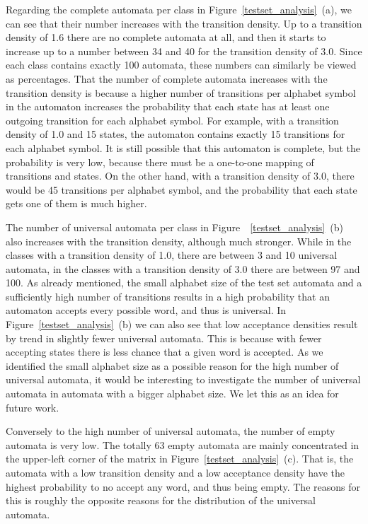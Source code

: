 Regarding the complete automata per class in Figure~\ref{testset_analysis}~(a), we can see that their number increases with the transition density. Up to a transition density of 1.6 there are no complete automata at all, and then it starts to increase up to a number between 34 and 40 for the transition density of 3.0. Since each class contains exactly 100 automata, these numbers can similarly be viewed as percentages. That the number of complete automata increases with the transition density is because a higher number of transitions per alphabet symbol in the automaton increases the probability that each state has at least one outgoing transition for each alphabet symbol. For example, with a transition density of 1.0 and 15 states, the automaton contains exactly 15 transitions for each alphabet symbol. It is still possible that this automaton is complete, but the probability is very low, because there must be a one-to-one mapping of transitions and states. On the other hand, with a transition density of 3.0, there would be 45 transitions per alphabet symbol, and the probability that each state gets one of them is much higher.

The number of universal automata per class in Figure~~\ref{testset_analysis}~(b) also increases with the transition density, although much stronger. While in the classes with a transition density of 1.0, there are between 3 and 10 universal automata, in the classes with a transition density of 3.0 there are between 97 and 100. As already mentioned, the small alphabet size of the \goal{} test set automata and a sufficiently high number of transitions results in a high probability that an automaton accepts every possible word, and thus is universal. In Figure~\ref{testset_analysis}~(b) we can also see that low acceptance densities result by trend in slightly fewer universal automata. This is because with fewer accepting states there is less chance that a given word is accepted. As we identified the small alphabet size as a possible reason for the high number of universal automata, it would be interesting to investigate the number of universal automata in automata with a bigger alphabet size. We let this as an idea for future work.

Conversely to the high number of universal automata, the number of empty automata is very low. The totally 63 empty automata are mainly concentrated in the upper-left corner of the matrix in Figure~\ref{testset_analysis}~(c). That is, the automata with a low transition density and a low acceptance density have the highest probability to no accept any word, and thus being empty. The reasons for this is roughly the opposite reasons for the distribution of the universal automata.


